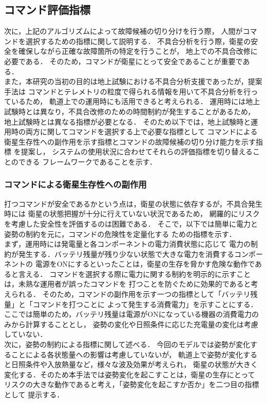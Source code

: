 \documentclass[11pt]{article}
\begin{document}
\subsection{コマンド評価指標}
次に，上記のアルゴリズムによって故障候補の切り分けを行う際，
人間がコマンドを選択するための指標に関して説明する．
不具合分析を行う際，衛星の安全を確保しながら正確な故障箇所の特定を行うことが，
地上での不具合改修に必要である．
そのため，コマンドが衛星にとって安全であることが重要である．\\
また，本研究の当初の目的は地上試験における不具合分析支援であったが，提案手法は
コマンドとテレメトリの粒度で得られる情報を用いて不具合分析を行っているため，
軌道上での運用時にも活用できると考えられる．
運用時には地上試験時とは異なり，不具合改修のための時間制約が発生することがあるため，
地上試験時とは異なる指標が必要となる．
そのため以下では，地上試験時と運用時の両方に関してコマンドを選択する上で必要な指標として
コマンドによる衛星生存性への副作用を示す指標とコマンドの故障候補の切り分け能力を示す指標
を提案し，
システムの使用状況に合わせてそれらの評価指標を切り替えることのできる
フレームワークであることを示す．

\subsubsection{コマンドによる衛星生存性への副作用}
打つコマンドが安全であるかという点は，衛星の状態に依存するが，不具合発生時には
衛星の状態把握が十分に行えていない状況であるため，
網羅的にリスクを考慮した安全性を評価するのは困難である．
そこで，以下では簡単に電力と姿勢の制約を元に，コマンドの危険性を定量化する
ための指標を示す．\\
まず，運用時には発電量と各コンポーネントの電力消費状態に応じて
電力の制約が発生する．バッテリ残量が残り少ない状態で大きな電力を消費するコンポーネントの
電源をONにするといったことは，衛星の生存を脅かす危険な動作であると言える．
コマンドを選択する際に電力に関する制約を明示的に示すことは，未熟な運用者が誤ったコマンドを
打つことを防ぐために効果的であると考えられる．
そのため，コマンドの副作用を示す一つの指標として「バッテリ残量」と「コマンドを打つことに
よって発生する消費電力」を示すことにする．
ここでは簡単のため，バッテリ残量は電源がONになっている機器の消費電力のみから計算することとし，
姿勢の変化や日照条件に応じた充電量の変化は考慮していない．\\
次に，姿勢の制約による指標に関して述べる．
今回のモデルでは姿勢が変化することによる各状態量への影響は考慮していないが，
軌道上で姿勢が変化すると日照条件や入放熱量など，様々な波及効果が考えられ，
衛星の状態が大きく変化する．そのため本手法では姿勢変化を起こすことは，衛星の生存にとって
リスクの大きな動作であると考え，「姿勢変化を起こすか否か」を二つ目の指標として
提示する．
\end{document}
